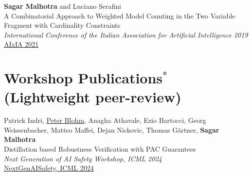 \documentclass[10pt, a4paper]{article}
\newcommand{\years}[1]{\marginnote{\scriptsize #1}}
\begin{document}
\years{2021}\textbf{Sagar Malhotra} and Luciano Serafini\\
 A Combinatorial Approach to Weighted Model Counting in the Two Variable Fragment with Cardinality Constraints\\ \emph{International Conference of the Italian Association for Artificial Intelligence 2019}\\
\href{https://link.springer.com/chapter/10.1007/978-3-031-08421-8_10}{AIxIA 2021}

\section*{Workshop Publications$^{*}$ (Lightweight peer-review)}
\years{2024} Patrick Indri, \underline{Peter Blohm}, Anagha Athavale, Ezio Bartocci, Georg Weissenbacher, Matteo Maffei, Dejan Nickovic, Thomas Gärtner, \textbf{Sagar Malhotra}\\
Distillation based Robustness Verification with PAC Guarantees\\
\emph{Next Generation of AI Safety Workshop, ICML 2024}\\
\href{https://openreview.net/forum?id=vflefS3lmB}{NextGenAISafety, ICML 2024}\\
\end{document}
